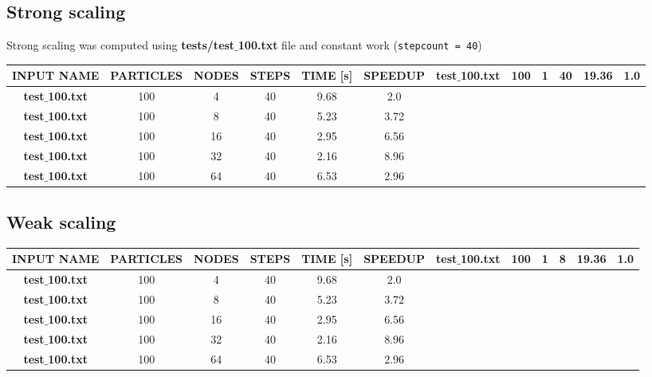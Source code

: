 \documentclass[12pt]{article}
\newcommand{\code}[1]{\texttt{#1}}
\begin{document}
\subsection*{Strong scaling}

Strong scaling was computed using \textbf{tests/test$\_$100.txt} file and constant work (\code{stepcount = 40})
\begin{center}
\begin{tabular}{ |c c c c c c| }
 \hline
 \textbf{INPUT NAME} & \textbf{PARTICLES} & \textbf{NODES} & \textbf{STEPS} & \textbf{TIME [s]} & \textbf{SPEEDUP} &
 \hline
 \textbf{test$\_$100.txt} & 100 & 1 & 40 & 19.36 & 1.0 \\
 \hline
 \textbf{test$\_$100.txt} & 100 & 4 & 40 & 9.68 & 2.0 \\
 \hline
 \textbf{test$\_$100.txt} & 100 & 8 & 40 & 5.23 & 3.72 \\
 \hline
 \textbf{test$\_$100.txt} & 100 & 16 & 40 & 2.95 & 6.56 \\
 \hline
 \textbf{test$\_$100.txt} & 100 & 32 & 40 & 2.16 & 8.96 \\
 \hline
 \textbf{test$\_$100.txt} & 100 & 64 & 40 & 6.53 & 2.96 \\
 \hline
\end{tabular}
\end{center}



\subsection*{Weak scaling}

\begin{center}
\begin{tabular}{ |c c c c c c| }
 \hline
 \textbf{INPUT NAME} & \textbf{PARTICLES} & \textbf{NODES} & \textbf{STEPS} & \textbf{TIME [s]} & \textbf{SPEEDUP} &
 \hline
 \textbf{test$\_$100.txt} & 100 & 1 & 8 & 19.36 & 1.0 \\
 \hline
 \textbf{test$\_$100.txt} & 100 & 4 & 40 & 9.68 & 2.0 \\
 \hline
 \textbf{test$\_$100.txt} & 100 & 8 & 40 & 5.23 & 3.72 \\
 \hline
 \textbf{test$\_$100.txt} & 100 & 16 & 40 & 2.95 & 6.56 \\
 \hline
 \textbf{test$\_$100.txt} & 100 & 32 & 40 & 2.16 & 8.96 \\
 \hline
 \textbf{test$\_$100.txt} & 100 & 64 & 40 & 6.53 & 2.96 \\
 \hline
\end{tabular}
\end{center}
\end{document}
